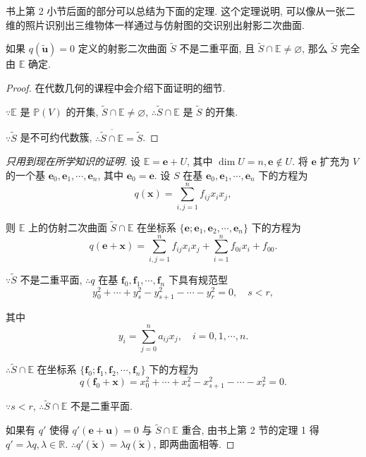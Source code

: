 \documentclass{ctexart}
\begin{document}
书上第 2 小节后面的部分可以总结为下面的定理. 这个定理说明, 可以像从一张二维的照片识别出三维物体一样通过与仿射图的交识别出射影二次曲面.
\begin{theorem}
    如果 $q(\tilde{\boldsymbol{u}})=0$ 定义的射影二次曲面 $\tilde{S}$ 不是二重平面, 且 $\tilde{S}\cap\mathbb{E}\neq\varnothing$, 那么 $\tilde{S}$ 完全由 $\mathbb{E}$ 确定.
\end{theorem}
\begin{proof}
    在代数几何的课程中会介绍下面证明的细节.

    $\because\mathbb{E}$ 是 $\mathbb{P}(V)$ 的开集, $\tilde{S}\cap\mathbb{E}\neq\varnothing$, $\therefore \tilde{S}\cap\mathbb{E}$ 是 $\tilde{S}$ 的开集.

    $\because \tilde{S}$ 是不可约代数簇, $\therefore\overline{\tilde{S}\cap\mathbb{E}}=\tilde{S}$.
\end{proof}
\begin{proof}[只用到现在所学知识的证明]
    设 $\mathbb{E}=\boldsymbol{e}+U$, 其中 $\dim U=n,\boldsymbol{e}\notin U$. 将 $\boldsymbol{e}$ 扩充为 $V$ 的一个基 $\boldsymbol{e}_0,\boldsymbol{e}_1,\cdots,\boldsymbol{e}_n$, 其中 $\boldsymbol{e}_0=\boldsymbol{e}$. 设 $S$ 在基 $\boldsymbol{e}_0,\boldsymbol{e}_1,\cdots,\boldsymbol{e}_n$ 下的方程为
    \[q(\boldsymbol{x})=\sum\limits_{i,j=1}^nf_{ij}x_ix_j,\]

    则 $\mathbb{E}$ 上的仿射二次曲面 $\tilde{S}\cap\mathbb{E}$ 在坐标系 $\{\boldsymbol{e};\boldsymbol{e}_1,\boldsymbol{e}_2,\cdots,\boldsymbol{e}_n\}$ 下的方程为
    \[q(\boldsymbol{e}+\boldsymbol{x})=\sum\limits_{i,j=1}^nf_{ij}x_ix_j+\sum\limits_{i=1}^nf_{0i}x_i+f_{00}.\]

    $\because\tilde{S}$ 不是二重平面, $\therefore q$ 在基 $\boldsymbol{f}_0,\boldsymbol{f}_1,\cdots,\boldsymbol{f}_n$ 下具有规范型
    \[y^2_0+\cdots+y^2_s-y^2_{s+1}-\cdots-y^2_r=0,\quad s<r,\]

    其中
    \[y_i=\sum\limits_{j=0}^na_{ij}x_j,\quad i=0,1,\cdots,n.\]

    $\therefore\tilde{S}\cap\mathbb{E}$ 在坐标系 $\{\boldsymbol{f}_0;\boldsymbol{f}_1,\boldsymbol{f}_2,\cdots,\boldsymbol{f}_n\}$ 下的方程为
    \[q(\boldsymbol{f}_0+\boldsymbol{x})=x^2_0+\cdots+x^2_s-x^2_{s+1}-\cdots-x^2_r=0.\]

    $\because s<r$, $\therefore\tilde{S}\cap\mathbb{E}$ 不是二重平面.

    如果有 $q'$ 使得 $q'(\boldsymbol{e}+\boldsymbol{u})=0$ 与 $\tilde{S}\cap\mathbb{E}$ 重合, 由书上第 2 节的定理 1 得 $q'=\lambda q,\lambda\in\mathbb{R}$. $\therefore q'(\tilde{\boldsymbol{x}})=\lambda q(\tilde{\boldsymbol{x}})$, 即两曲面相等.
\end{proof}
\end{document}
